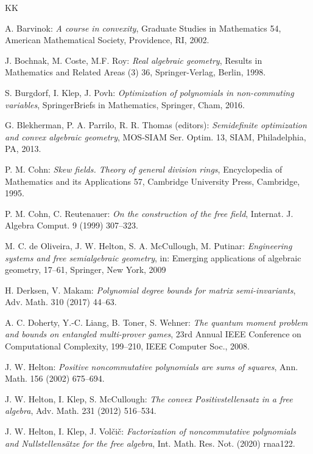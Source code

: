 \documentclass[12pt,a4paper]{amsart}
\theoremstyle{definition}
\theoremstyle{remark}
\numberwithin{equation}{section}
\begin{document}

\begin{thebibliography}{KK}
	
A. Barvinok:
{\it A course in convexity}, 
Graduate Studies in Mathematics 54, American Mathematical Society, Providence, RI, 2002.

J. Bochnak, M. Coste, M.F. Roy: 
{\it Real algebraic geometry},
Results in Mathematics and Related Areas (3) 36, 
Springer-Verlag, Berlin, 1998.

S. Burgdorf, I. Klep, J. Povh:
{\it Optimization of polynomials in non-commuting variables},
SpringerBriefs in Mathematics, Springer, Cham, 2016.

G. Blekherman, P. A. Parrilo, R. R. Thomas (editors):
{\it Semidefinite optimization and convex algebraic geometry},
MOS-SIAM Ser. Optim. 13, SIAM, Philadelphia, PA, 2013. 

P. M. Cohn:
{\it Skew fields. Theory of general division rings}, 
Encyclopedia of Mathematics and its Applications 57, Cambridge University Press, Cambridge, 1995.

P. M. Cohn, C. Reutenauer:
{\it On the construction of the free field},
Internat. J. Algebra Comput. 9 (1999) 307--323. 

M. C. de Oliveira, J. W. Helton, S. A. McCullough, M. Putinar:
{\it Engineering systems and free semialgebraic geometry},
in: Emerging applications of algebraic geometry, 17--61, Springer, New York, 2009

H. Derksen, V. Makam:
{\it Polynomial degree bounds for matrix semi-invariants},
Adv. Math. 310 (2017) 44--63. 

A. C. Doherty, Y.-C. Liang, B. Toner, S. Wehner:
{\it The quantum moment problem and bounds on entangled multi-prover games},
23rd Annual IEEE Conference on Computational Complexity, 199--210, IEEE Computer Soc., 2008.

J. W. Helton:
{\it Positive noncommutative polynomials are sums of squares},
Ann. Math. 156 (2002) 675--694.

J. W. Helton, I. Klep, S. McCullough:
{\it The convex Positivstellensatz in a free algebra},
Adv. Math. 231 (2012) 516--534.

J. W. Helton, I. Klep, J. Vol\v{c}i\v{c}: 
{\it Factorization of noncommutative polynomials and Nullstellens\"atze for the free algebra},
Int. Math. Res. Not. (2020) rnaa122.


\end{thebibliography}
\end{document}
